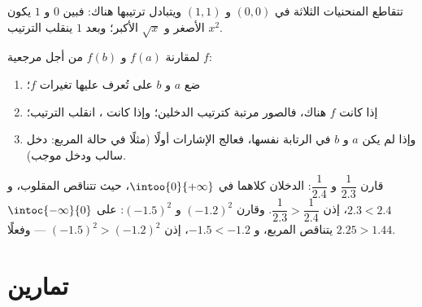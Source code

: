 \begin{omfigure}

{\small تتقاطع المنحنيات الثلاثة في $(0,0)$ و $(1,1)$ ويتبادل ترتيبها
هناك: فبين $0$ و $1$ يكون $x^2$ الأصغر و $\sqrt x$
الأكبر؛ وبعد $1$ ينقلب الترتيب.}
\end{omfigure}

\begin{method}\label{met:g10:reffunc:compare}
لمقارنة $f(a)$ و $f(b)$ من أجل  مرجعية $f$:
\begin{enumerate}
  \item ضع $a$ و $b$ على  تُعرف عليها تغيرات
        $f$؛
  \item إذا كانت $f$  هناك، فالصور مرتبة كترتيب
        الدخلين؛ وإذا كانت ، انقلب الترتيب؛
  \item وإذا لم يكن $a$ و $b$ في  الرتابة نفسها، فعالج
        الإشارات أولًا (مثلًا في حالة المربع: دخل سالب ودخل
        موجب).
\end{enumerate}
\end{method}

\begin{example}
قارن $\dfrac{1}{2.3}$ و $\dfrac{1}{2.4}$: الدخلان كلاهما في
$\intoo{0}{+\infty}$، حيث تتناقص  المقلوب، و
$2.3 < 2.4$، إذن $\dfrac{1}{2.3} > \dfrac{1}{2.4}$. وقارن $(-1.2)^2$
و $(-1.5)^2$: على $\intoc{-\infty}{0}$ يتناقص المربع، و
$-1.5 < -1.2$، إذن $(-1.5)^2 > (-1.2)^2$ --- وفعلًا $2.25 > 1.44$.
\end{example}

\section{تمارين}

